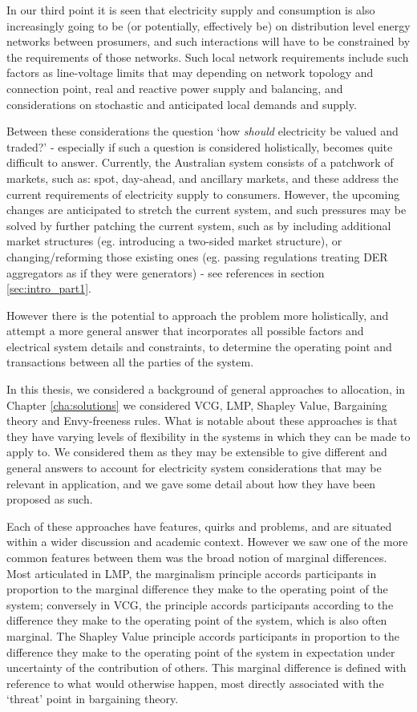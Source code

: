 In our third point it is seen that electricity supply and consumption is also increasingly going to be (or potentially, effectively be) on distribution level energy networks between prosumers, and such interactions will have to be constrained by the requirements of those networks. Such local network requirements include such factors as line-voltage limits that may depending on network topology and connection point, real and reactive power supply and balancing, and considerations on stochastic and anticipated local demands and supply.

Between these considerations the question `how \textit{should} electricity be valued and traded?' - especially if such a question is considered holistically, becomes quite difficult to answer.
Currently, the Australian system consists of a patchwork of markets, such as: spot, day-ahead, and ancillary markets, and these address the current requirements of electricity supply to consumers.
However, the upcoming changes are anticipated to stretch the current system, and such pressures may be solved by further patching the current system, such as by including additional market structures (eg. introducing a two-sided market structure), or changing/reforming those existing ones (eg. passing regulations treating DER aggregators as if they were generators) - see references in section \ref{sec:intro_part1}.

However there is the potential to approach the problem more holistically, and attempt a more general answer that incorporates all possible factors and electrical system details and constraints, to determine the operating point and transactions between all the parties of the system.

In this thesis, we considered a background of general approaches to allocation, in Chapter \ref{cha:solutions} we considered VCG, LMP, Shapley Value, Bargaining theory and Envy-freeness rules.
What is notable about these approaches is that they have varying levels of flexibility in the systems in which they can be made to apply to.
We considered them as they may be extensible to give different and general answers to account for electricity system considerations that may be relevant in application, and we gave some detail about how they have been proposed as such.

Each of these approaches have features, quirks and problems, and are situated within a wider discussion and academic context. However we saw one of the more common features between them was the broad notion of marginal differences.
Most articulated in LMP, the marginalism principle accords participants in proportion to the marginal difference they make to the operating point of the system; conversely in VCG, the principle accords participants according to the difference they make to the operating point of the system, which is also often marginal.
The Shapley Value principle accords participants in proportion to the difference they make to the operating point of the system in expectation under uncertainty of the contribution of others.
This marginal difference is defined with reference to what would otherwise happen, most directly associated with the `threat' point in bargaining theory.

